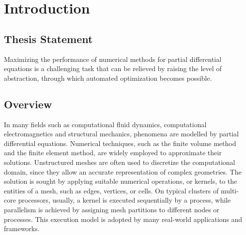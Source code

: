 \chapter{Introduction}

\section{Thesis Statement}




Maximizing the performance of numerical methods for partial differential equations is a challenging task that can be relieved by raising the level of abstraction, through which automated optimization becomes possible. 

\section{Overview}
In many fields such as computational fluid dynamics, computational electromagnetics and structural mechanics, phenomena are modelled by partial differential equations. Numerical techniques, such as the finite volume method and the finite element method, are widely employed to approximate their solutions. Unstructured meshes are often used to discretize the computational domain, since they allow an accurate representation of complex geometries. The solution is sought by applying suitable numerical operations, or kernels, to the entities of a mesh, such as edges, vertices, or cells. On typical clusters of multi-core processors, usually, a kernel is executed sequentially by a process, while parallelism is achieved by assigning mesh partitions to different nodes or processes. This execution model is adopted by many real-world applications and frameworks.

